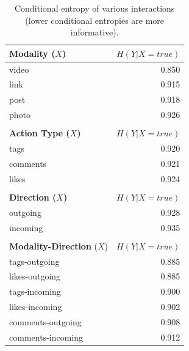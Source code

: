 
\begin{table}
\caption{Conditional entropy of various interactions (lower conditional
entropies are more informative).}
\label{table:ce_interaction}
\vspace{-2mm}
\centering
{\footnotesize
	\begin{tabular}{| >{\small}l | >{\small}r | }
		\hline
		\textbf{ Modality ($X$)} & $H(Y|X=true)$ \\
		\hline
		{ video } & 0.850 \\
		\hline
		{ link } & 0.915 \\
		\hline
		{ post } & 0.918 \\
		\hline
		{ photo } & 0.926 \\
		\hline
\multicolumn{2}{c}{}\\
		\hline
		\textbf{Action Type ($X$)}  & $H(Y|X=true)$ \\
		\hline
		{ tags }  &  0.920 \\
		\hline
		{ comments }  &  0.921 \\
		\hline
		{ likes }  &  0.924 \\
		\hline
\multicolumn{2}{c}{}\\
		\hline
		\textbf{ Direction ($X$) } & $H(Y|X=true)$ \\
		\hline
		{ outgoing }  &  0.928 \\
		\hline
		{ incoming }  &  0.935 \\
		\hline
\multicolumn{2}{c}{}\\
%	
		\hline
		\textbf{Modality-Direction} ($X$) & $H(Y|X=true)$ \\
		\hline
		tags-outgoing & 0.885 \\
		likes-outgoing & 0.885 \\
		tags-incoming & 0.900 \\
		likes-incoming & 0.902 \\
		comments-outgoing & 0.908 \\
		comments-incoming & 0.912 \\

\end{tabular}}
\end{table}
